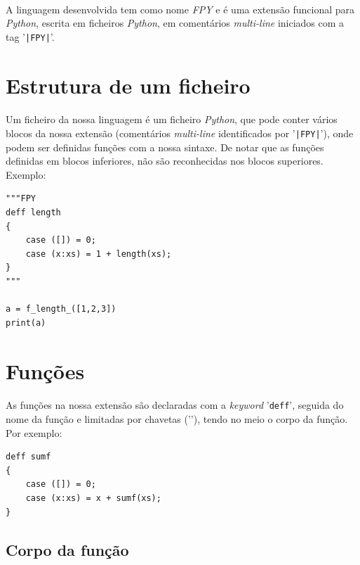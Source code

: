 \documentclass[11pt,a4paper]{report}
\begin{document}
\paragraph*{}
A linguagem desenvolvida tem como nome \textit{FPY} e é uma extensão funcional para \textit{Python}, escrita em ficheiros \textit{Python}, em comentários \textit{multi-line} iniciados com a tag '\texttt{|\textcolor{mls_orange}{FPY}|}'.

\section{Estrutura de um ficheiro} \label{sec:descricaoProblema}
\paragraph*{}
Um ficheiro da nossa linguagem é um ficheiro \textit{Python}, que pode conter vários blocos da nossa extensão (comentários \textit{multi-line} identificados por '\texttt{|\textcolor{mls_orange}{FPY}|}'), onde podem ser definidas funções com a nossa sintaxe. De notar que as funções definidas em blocos inferiores, não são reconhecidas nos blocos superiores. Exemplo:

\begin{verbatim}
"""FPY
deff length
{
    case ([]) = 0;
    case (x:xs) = 1 + length(xs); 
}
"""

a = f_length_([1,2,3])
print(a)
\end{verbatim}

\section{Funções}
\paragraph*{}
As funções na nossa extensão são declaradas com a \textit{keyword} '\texttt{deff}', seguida do nome da função e limitadas por chavetas ('\texttt{{}}'), tendo no meio o corpo da função. Por exemplo:

\begin{verbatim}
deff sumf
{
    case ([]) = 0;
    case (x:xs) = x + sumf(xs); 
}
\end{verbatim}

\subsection{Corpo da função}
\end{document}
